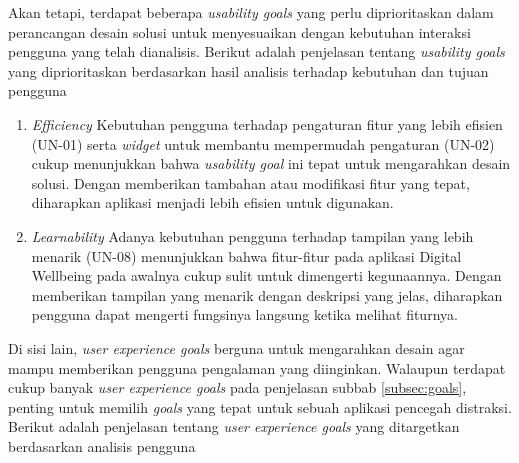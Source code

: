 Akan tetapi, terdapat beberapa \textit{usability goals} yang perlu diprioritaskan dalam perancangan desain solusi untuk menyesuaikan dengan kebutuhan interaksi pengguna yang telah dianalisis. Berikut adalah penjelasan tentang \textit{usability goals} yang diprioritaskan berdasarkan hasil analisis terhadap kebutuhan dan tujuan pengguna

\begin{enumerate}
  \item \textit{Efficiency}
  \subitem Kebutuhan pengguna terhadap pengaturan fitur yang lebih efisien (UN-01) serta \textit{widget} untuk membantu mempermudah pengaturan (UN-02) cukup menunjukkan bahwa \textit{usability goal} ini tepat untuk mengarahkan desain solusi. Dengan memberikan tambahan atau modifikasi fitur yang tepat, diharapkan aplikasi menjadi lebih efisien untuk digunakan. 

  \item \textit{Learnability}
  \subitem Adanya kebutuhan pengguna terhadap tampilan yang lebih menarik (UN-08) menunjukkan bahwa fitur-fitur pada aplikasi Digital Wellbeing pada awalnya cukup sulit untuk dimengerti kegunaannya. Dengan memberikan tampilan yang menarik dengan deskripsi yang jelas, diharapkan pengguna dapat mengerti fungsinya langsung ketika melihat fiturnya.
  
\end{enumerate}

Di sisi lain, \textit{user experience goals} berguna untuk mengarahkan desain agar mampu memberikan pengguna pengalaman yang diinginkan. Walaupun terdapat cukup banyak \textit{user experience goals} pada penjelasan subbab \ref{subsec:goals}, penting untuk memilih \textit{goals} yang tepat untuk sebuah aplikasi pencegah distraksi. Berikut adalah penjelasan tentang \textit{user experience goals} yang ditargetkan berdasarkan analisis pengguna

